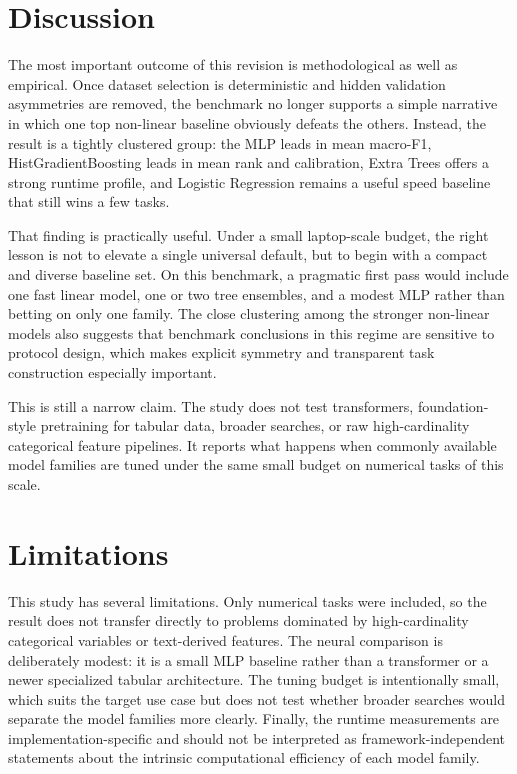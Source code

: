 \documentclass{ieeeaccess}
\begin{document}
\begin{table}[!t]
\caption{Average seed-to-seed variability aggregated over tasks. Lower is better.}
\label{tab:stability}
\centering
\scriptsize
\resizebox{\columnwidth}{!}{}
\end{table}

\section{Discussion}
The most important outcome of this revision is methodological as well as empirical. Once dataset selection is deterministic and hidden validation asymmetries are removed, the benchmark no longer supports a simple narrative in which one top non-linear baseline obviously defeats the others. Instead, the result is a tightly clustered group: the MLP leads in mean macro-F1, HistGradientBoosting leads in mean rank and calibration, Extra Trees offers a strong runtime profile, and Logistic Regression remains a useful speed baseline that still wins a few tasks.

That finding is practically useful. Under a small laptop-scale budget, the right lesson is not to elevate a single universal default, but to begin with a compact and diverse baseline set. On this benchmark, a pragmatic first pass would include one fast linear model, one or two tree ensembles, and a modest MLP rather than betting on only one family. The close clustering among the stronger non-linear models also suggests that benchmark conclusions in this regime are sensitive to protocol design, which makes explicit symmetry and transparent task construction especially important.

This is still a narrow claim. The study does not test transformers, foundation-style pretraining for tabular data, broader searches, or raw high-cardinality categorical feature pipelines. It reports what happens when commonly available model families are tuned under the same small budget on numerical tasks of this scale.

\section{Limitations}
This study has several limitations. Only numerical tasks were included, so the result does not transfer directly to problems dominated by high-cardinality categorical variables or text-derived features. The neural comparison is deliberately modest: it is a small MLP baseline rather than a transformer or a newer specialized tabular architecture. The tuning budget is intentionally small, which suits the target use case but does not test whether broader searches would separate the model families more clearly. Finally, the runtime measurements are implementation-specific and should not be interpreted as framework-independent statements about the intrinsic computational efficiency of each model family.
\end{document}
